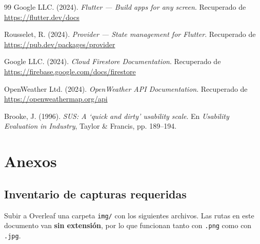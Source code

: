 \documentclass[12pt,a4paper]{article}
\begin{document}
\begin{thebibliography}{99}
Google LLC. (2024). \textit{Flutter --- Build apps for any screen}.
Recuperado de \url{https://flutter.dev/docs}

Rousselet, R. (2024). \textit{Provider --- State management for Flutter}.
Recuperado de \url{https://pub.dev/packages/provider}

Google LLC. (2024). \textit{Cloud Firestore Documentation}.
Recuperado de \url{https://firebase.google.com/docs/firestore}

OpenWeather Ltd. (2024). \textit{OpenWeather API Documentation}.
Recuperado de \url{https://openweathermap.org/api}

Brooke, J. (1996). \textit{SUS: A `quick and dirty' usability scale}. En
\textit{Usability Evaluation in Industry}, Taylor \& Francis, pp. 189--194.

\end{thebibliography}

\newpage
\section*{Anexos}
\label{anexo:capturas}

\subsection*{Inventario de capturas requeridas}

Subir a Overleaf una carpeta \texttt{img/} con los siguientes archivos. Las
rutas en este documento van \textbf{sin extensión}, por lo que funcionan tanto
con \texttt{.png} como con \texttt{.jpg}.
\end{document}
